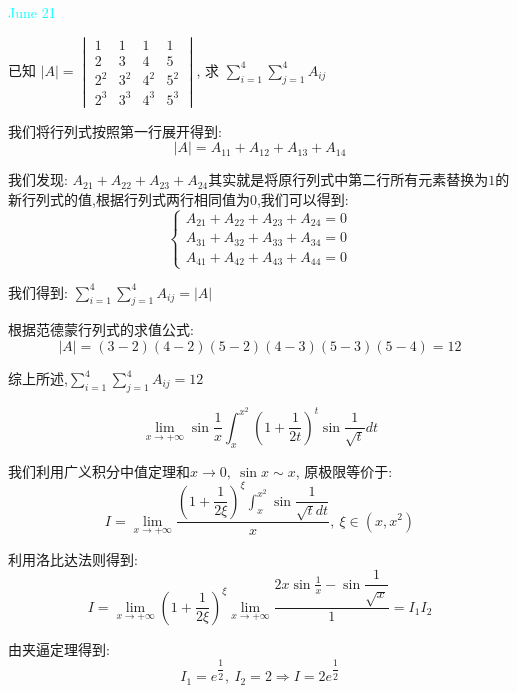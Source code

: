 \textcolor{cyan}{June 21}

\begin{example}[][Exam: 32.3.13]
	已知 $|A|=
\begin{vmatrix}
	1&1&1&1\\
	2&3&4&5\\
	2^2&3^2&4^2&5^2\\
	2^3&3^3&4^3&5^3
\end{vmatrix}$, 求 $\sum\limits_{i=1}^{4}\sum\limits_{j=1}^{4}A_{ij}$
\end{example}

\begin{solution}
	
	我们将行列式按照第一行展开得到: 
	$$|A|=A_{11}+A_{12}+A_{13}+A_{14}$$
	
	我们发现: $A_{21}+A_{22}+A_{23}+A_{24}$其实就是将原行列式中第二行所有元素替换为$1$的新行列式的值,根据行列式两行相同值为$0$,我们可以得到: 
	$$\left\lbrace
	\begin{array}{l}
		A_{21}+A_{22}+A_{23}+A_{24}=0\\
		A_{31}+A_{32}+A_{33}+A_{34}=0\\
		A_{41}+A_{42}+A_{43}+A_{44}=0
	\end{array}
	\right. $$
	
	我们得到: $\sum\limits_{i=1}^{4}\sum\limits_{j=1}^{4}A_{ij}=|A|$
	
	根据范德蒙行列式的求值公式: 
	$$|A|=(3-2)(4-2)(5-2)(4-3)(5-3)(5-4)=12$$
	
	综上所述,$\sum\limits_{i=1}^{4}\sum\limits_{j=1}^{4}A_{ij}=12$
\end{solution}

\begin{example}[][Exam: 32.3.14]
	$$\lim\limits_{x\to +\infty}\sin\frac{1}{x}\int_{x}^{x^2}(1+\dfrac{1}{2t})^{t}\sin\dfrac{1}{\sqrt{t}}dt$$
\end{example}

\begin{solution}
	
	我们利用广义积分中值定理和$x\to 0,\ \sin x\sim x$, 原极限等价于: 
	$$I=\lim\limits_{x\to +\infty}\dfrac{(1+\dfrac{1}{2\xi})^{\xi}\int_{x}^{x^2}\sin\dfrac{1}{\sqrt{t}dt}}{x},\ \xi\in(x,x^2)$$
	
	利用洛比达法则得到: 
	$$I=\lim\limits_{x\to +\infty}(1+\dfrac{1}{2\xi})^{\xi} \lim\limits_{x\to +\infty}\dfrac{2x\sin\frac{1}{x}-\sin\dfrac{1}{\sqrt{x}}}{1}=I_{1}I_{2}$$
	
	由夹逼定理得到: 
	$$I_{1}=e^{\dfrac{1}{2}},\  I_{2}=2\Rightarrow I=2e^{\dfrac{1}{2}}$$
\end{solution}


